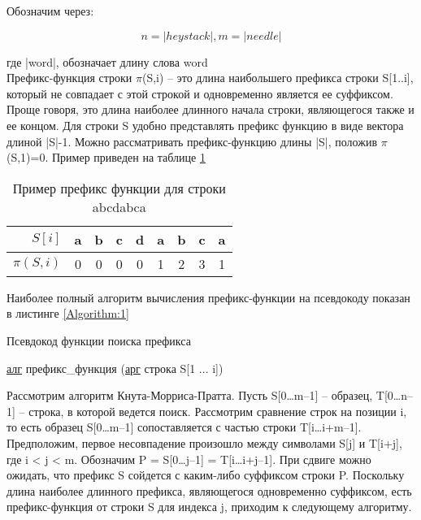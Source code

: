 \documentclass[../main.tex]{subfiles}
\begin{document}
	Обозначим через:
	
	\begin{equation}
		n = | heystack |, m = | needle |
	\end{equation}
	
	где |word|, обозначает длину слова word \\
	
	Префикс-функция строки $\pi$(S,i) – это длина наибольшего префикса строки S[1..i], который не совпадает с этой строкой и одновременно является ее суффиксом. 
	Проще говоря, это длина наиболее длинного начала строки, являющегося также и ее концом. 
	Для строки S удобно представлять префикс функцию в виде вектора длиной |S|-1. Можно рассматривать префикс-функцию длины |S|, положив $\pi$(S,1)=0. 
	Пример приведен на таблице \ref{tab:analit:1}
	
	\begin{table}
		\label{tab:analit:1}
		\caption{Пример префикс функции для строки abcdabca}
		\centering
		\begin{tabular}{|r|c|c|c|c|c|c|c|c|}
			\hline
			$S[i]$ &          a &          b &          c &          d &          a &          b &          c &          a \\
			\hline
			$\pi(S, i)$&          0 &          0 &          0 &          0 &          1 &          2 &          3 &          1 \\
			\hline
		\end{tabular}
	\end{table}
	
	\vspace{3mm}
	Наиболее полный алгоритм вычисления префикс-функции на псевдокоду показан в листинге \ref{Algorithm:1}
	
	\begin{algorithm}[H]
		\caption{Псевдокод функции поиска префикса}
		\label{Algorithm:1}
		\underline{алг} префикс\_функция (\underline{арг} строка S[1 ... i])
	\end{algorithm}
	
	\vspace{3mm}
	Рассмотрим алгоритм Кнута-Морриса-Пратта. 
	Пусть S[0…m–1] – образец, T[0…n–1] – строка, в которой ведется поиск. 
	Рассмотрим сравнение строк на позиции i, то есть образец S[0…m–1] сопоставляется с частью строки T[i…i+m–1]. 
	Предположим, первое несовпадение произошло между символами S[j] и T[i+j], где i < j < m. Обозначим P = S[0…j–1] = T[i…i+j–1]. 
	При сдвиге можно ожидать, что префикс S сойдется с каким-либо суффиксом строки P. Поскольку длина наиболее длинного префикса, являющегося одновременно суффиксом, есть префикс-функция от строки S для индекса j, приходим к следующему алгоритму.
	
\end{document}
